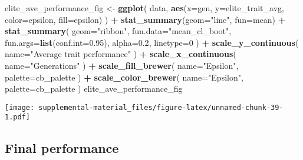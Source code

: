 \documentclass[]{book}
\newenvironment{Shaded}{\begin{snugshade}}{\end{snugshade}}
\newcommand{\DataTypeTok}[1]{\textcolor[rgb]{0.13,0.29,0.53}{#1}}
\newcommand{\DecValTok}[1]{\textcolor[rgb]{0.00,0.00,0.81}{#1}}
\newcommand{\FloatTok}[1]{\textcolor[rgb]{0.00,0.00,0.81}{#1}}
\newcommand{\KeywordTok}[1]{\textcolor[rgb]{0.13,0.29,0.53}{\textbf{#1}}}
\newcommand{\NormalTok}[1]{#1}
\newcommand{\OperatorTok}[1]{\textcolor[rgb]{0.81,0.36,0.00}{\textbf{#1}}}
\newcommand{\StringTok}[1]{\textcolor[rgb]{0.31,0.60,0.02}{#1}}
\begin{document}
\begin{Shaded}
\begin{Highlighting}[]
\NormalTok{elite_ave_performance_fig <-}
\StringTok{  }\KeywordTok{ggplot}\NormalTok{(}
\NormalTok{    data,}
    \KeywordTok{aes}\NormalTok{(}\DataTypeTok{x=}\NormalTok{gen, }\DataTypeTok{y=}\NormalTok{elite_trait_avg, }\DataTypeTok{color=}\NormalTok{epsilon, }\DataTypeTok{fill=}\NormalTok{epsilon)}
\NormalTok{  ) }\OperatorTok{+}
\StringTok{  }\KeywordTok{stat_summary}\NormalTok{(}\DataTypeTok{geom=}\StringTok{"line"}\NormalTok{, }\DataTypeTok{fun=}\NormalTok{mean) }\OperatorTok{+}
\StringTok{  }\KeywordTok{stat_summary}\NormalTok{(}
    \DataTypeTok{geom=}\StringTok{"ribbon"}\NormalTok{,}
    \DataTypeTok{fun.data=}\StringTok{"mean_cl_boot"}\NormalTok{,}
    \DataTypeTok{fun.args=}\KeywordTok{list}\NormalTok{(}\DataTypeTok{conf.int=}\FloatTok{0.95}\NormalTok{),}
    \DataTypeTok{alpha=}\FloatTok{0.2}\NormalTok{,}
    \DataTypeTok{linetype=}\DecValTok{0}
\NormalTok{  ) }\OperatorTok{+}
\StringTok{  }\KeywordTok{scale_y_continuous}\NormalTok{(}
    \DataTypeTok{name=}\StringTok{"Average trait performance"}
\NormalTok{  ) }\OperatorTok{+}
\StringTok{  }\KeywordTok{scale_x_continuous}\NormalTok{(}
    \DataTypeTok{name=}\StringTok{"Generations"}
\NormalTok{  ) }\OperatorTok{+}
\StringTok{  }\KeywordTok{scale_fill_brewer}\NormalTok{(}
    \DataTypeTok{name=}\StringTok{"Epsilon"}\NormalTok{,}
    \DataTypeTok{palette=}\NormalTok{cb_palette}
\NormalTok{  ) }\OperatorTok{+}
\StringTok{  }\KeywordTok{scale_color_brewer}\NormalTok{(}
    \DataTypeTok{name=}\StringTok{"Epsilon"}\NormalTok{,}
    \DataTypeTok{palette=}\NormalTok{cb_palette}
\NormalTok{  )}
\NormalTok{elite_ave_performance_fig}
\end{Highlighting}
\end{Shaded}

\texttt{[image: supplemental-material\_files/figure-latex/unnamed-chunk-39-1.pdf]}

\hypertarget{final-performance-3}{%
\subsection{Final performance}\label{final-performance-3}}
\end{document}
